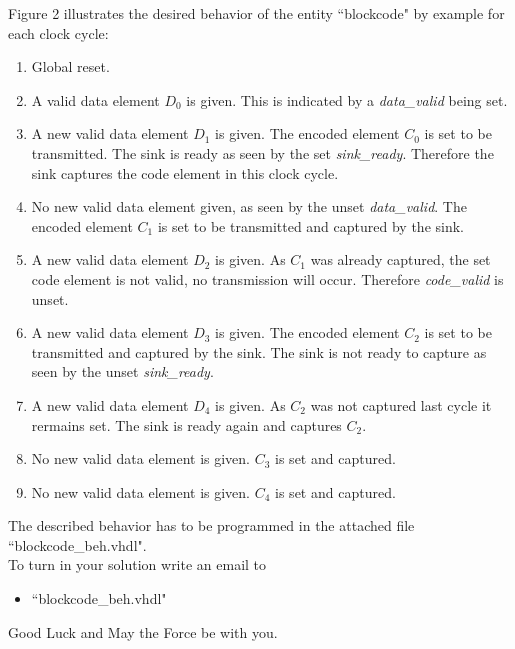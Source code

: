 \documentclass[a4paper,12pt]{article}
\begin{document}
Figure 2 illustrates the desired behavior of the entity ``blockcode" by example for each clock cycle:
\begin{enumerate}
\item Global reset.
\item A valid data element $D_0$ is given. This is indicated by a \textit{data\_valid} being set.
\item A new valid data element $D_1$ is given. The encoded element $C_0$ is set to be transmitted. The sink is ready as seen by the set \textit{sink\_ready}. Therefore the sink captures the code element in this clock cycle.
\item No new valid data element given, as seen by the unset \textit{data\_valid}. The encoded element $C_1$ is set to be transmitted and captured by the sink.
\item A new valid data element $D_2$ is given. As $C_1$ was already captured, the set code element is not valid, no transmission will occur. Therefore \textit{code\_valid} is unset.
\item A new valid data element $D_3$ is given. The encoded element $C_2$ is set to be transmitted and captured by the sink. The sink is not ready to capture as seen by the unset \textit{sink\_ready}.
\item A new valid data element $D_4$ is given. As $C_2$ was not captured last cycle it rermains set. The sink is ready again and captures $C_2$.
\item No new valid data element is given. $C_3$ is set and captured.
\item No new valid data element is given. $C_4$ is set and captured.
\end{enumerate}


\vspace{2.5cm}
The described  behavior has to be programmed in the attached file ``blockcode\_beh.vhdl".\\

To turn in your solution write an email to %
\begin{itemize}
\item ``blockcode\_beh.vhdl"
\end{itemize}

\vspace{0.7cm}
Good Luck and May the Force be with you.
\end{document}
